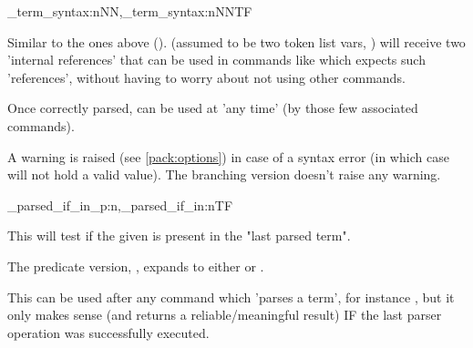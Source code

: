 \documentclass[10pt]{article}
\begin{document}
\begin{codedescribe}[code,new=2023/11/28]{\starray_term_syntax:nNN,\starray_term_syntax:nNNTF}
\begin{codesyntax}%
\end{codesyntax}
Similar to the ones above ().  (assumed to be two token list vars, ) will receive two 'internal references' that can be used in commands like  which expects such 'references', without having to worry about not using other \tsobj{\starray_} commands.
\end{codedescribe}
\begin{tsremark}
Once correctly parsed,  can be used at 'any time' (by those few  associated commands).\end{tsremark}
\begin{tsremark}
A warning is raised (see \ref{pack:options}) in case of a  syntax error (in which case  will not hold a valid value). The branching version doesn't raise any warning.
\end{tsremark}


\begin{codedescribe}[code,EXP,new=2023/05/20]{\starray_parsed_if_in_p:n,\starray_parsed_if_in:nTF}
\begin{codesyntax}%
\end{codesyntax}
This will test if the given  is present in the "last parsed term". 
\end{codedescribe}
\begin{tsremark}
The predicate version, , expands to either  or .
\end{tsremark}
\begin{tsremark}
This can be used after any command which 'parses a term', for instance , but it only makes sense (and returns a reliable/meaningful result) IF the last parser operation was successfully executed.
\end{tsremark}
\end{document}
